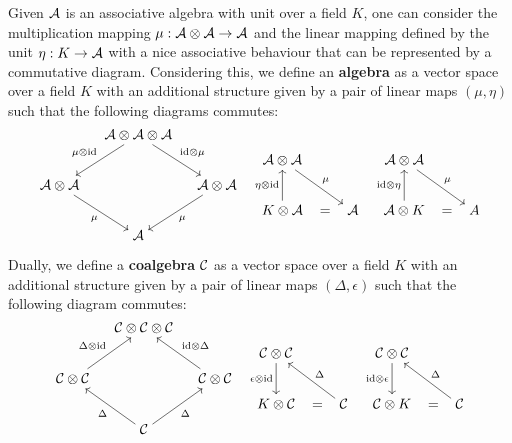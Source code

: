 Given $\mathcal{A}$ is an associative algebra with unit over a field $K$, one can consider the multiplication mapping $\mu:\mathcal{A}\otimes\mathcal{A}\to\mathcal{A}$ and the linear mapping defined by the unit $\eta:K\to\mathcal{A}$ with a nice associative behaviour that can be represented by a commutative diagram. Considering this, we define an \textbf{algebra} as a vector space over a field $K$ with an additional structure given by a pair of linear maps $(\mu,\eta)$ such that the following diagrams commutes:
\[\begin{tikzcd}[cramped,sep=tiny]
	&& {\A \otimes \A \otimes \A} \\
	&&&&&& {\A \otimes \A} &&&& {\A \otimes \A} \\
	{\A \otimes \A} &&&& {\A \otimes \A} \\
	&&&&&& {K \otimes \A} & {=} & \A && {\A \otimes K} & {=} & A \\
	&& \A
	\arrow["{\mu\otimes\mathrm{id}}"', from=1-3, to=3-1]
	\arrow["{\mathrm{id}\otimes\mu}", from=1-3, to=3-5]
	\arrow["\mu", from=2-7, to=4-9]
	\arrow["\mu", from=2-11, to=4-13]
	\arrow["\mu"', from=3-1, to=5-3]
	\arrow["\mu", from=3-5, to=5-3]
	\arrow["{\eta \otimes \mathrm{id}}", from=4-7, to=2-7]
	\arrow["{\mathrm{id} \otimes \eta}", from=4-11, to=2-11]
\end{tikzcd}\]

Dually, we define a \textbf{coalgebra} $\mathcal{C}$ as a vector space over a field $K$ with an additional structure given by a pair of linear maps $(\Delta,\epsilon)$ such that the following diagram commutes:
\[\begin{tikzcd}[cramped,sep=tiny]
	&& {\C \otimes \C \otimes \C} \\
	&&&&&& {\C \otimes \C} &&&& {\C \otimes \C} \\
	{\C \otimes \C} &&&& {\C \otimes \C} \\
	&&&&&& {K \otimes \C} & {=} & \C && {\C \otimes K} & {=} & \C \\
	&& \C
	\arrow["{\epsilon \otimes \mathrm{id}}"', from=2-7, to=4-7]
	\arrow["{\mathrm{id} \otimes \epsilon}"', from=2-11, to=4-11]
	\arrow["{\Delta\otimes\mathrm{id}}", from=3-1, to=1-3]
	\arrow["{\mathrm{id}\otimes\Delta}"', from=3-5, to=1-3]
	\arrow["\Delta"', from=4-9, to=2-7]
	\arrow["\Delta"', from=4-13, to=2-11]
	\arrow["\Delta", from=5-3, to=3-1]
	\arrow["\Delta"', from=5-3, to=3-5]
\end{tikzcd}\]

